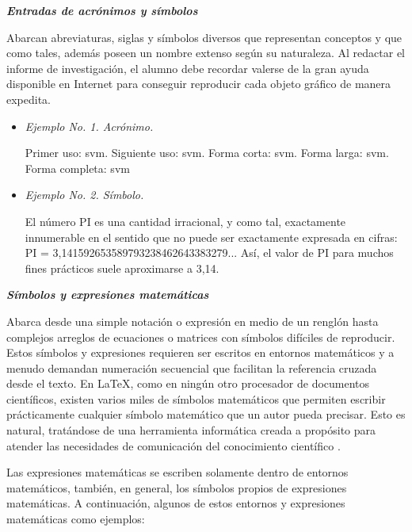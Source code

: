 \textit{\textbf{Entradas de acrónimos y símbolos}}

Abarcan abreviaturas, siglas y símbolos diversos que representan conceptos y que como tales, además poseen un nombre extenso según su naturaleza. Al redactar el informe de investigación, el alumno debe recordar valerse de la gran ayuda disponible en Internet para conseguir reproducir cada objeto gráfico de manera expedita.
\begin{itemize}
\item \textit{Ejemplo No. 1. Acrónimo.}

Primer uso: \gls{svm}\@. Siguiente uso: \gls{svm}\@. Forma corta: \acrshort{svm}\@. Forma larga: \acrlong{svm}\@. Forma completa: \acrfull{svm}\@ 
{} %

\item \textit{Ejemplo No. 2. Símbolo.}


El número \gls{PI} es una cantidad irracional, y como tal, exactamente innumerable en el sentido que no puede ser exactamente expresada en cifras: \gls{PI} = 3,141592653589793238462643383279...  Así, el valor de \gls{PI} para muchos fines prácticos suele aproximarse a 3,14.

\end{itemize}

\textit{\textbf{Símbolos y expresiones matemáticas}}

Abarca desde una simple notación o expresión en medio de un renglón hasta complejos arreglos de ecuaciones o matrices con símbolos difíciles de reproducir. Estos símbolos y expresiones requieren ser escritos en entornos matemáticos y a menudo demandan numeración secuencial que facilitan la referencia cruzada desde el texto. En \LaTeX, como en ningún otro procesador de documentos científicos, existen varios miles de símbolos matemáticos que permiten escribir prácticamente cualquier símbolo matemático que un autor pueda precisar. Esto es natural, tratándose de una herramienta informática creada a propósito para atender las necesidades de comunicación del conocimiento científico \cite{knuth, lamport}.

Las expresiones matemáticas se escriben solamente dentro de entornos matemáticos, también, en general, los símbolos propios de expresiones matemáticas. A continuación, algunos de estos entornos y expresiones matemáticas como ejemplos:

